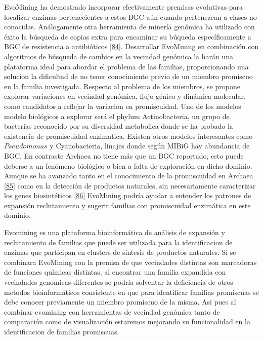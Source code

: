 \documentclass[12pt,twoside]{reedthesis}
\begin{document}
  EvoMining ha demostrado incorporar efectivamente premisas evolutivas
  para localizar enzimas pertenecientes a estos BGC aún cuando pertenezcan
  a clases no conocidas. Análogamente otra herramienta de minería genómica
  ha utilizado con éxito la búsqueda de copias extra para encaminar su
  búqueda específicamente a BGC de resistencia a antibióticos
  {[}\protect\hyperlink{ref-alanjary_antibiotic_2017}{84}{]}. Desarrollar
  EvoMining en combinación con algoritmos de búsqueda de cambios en la
  vecindad genómica la harán una plataforma ideal para abordar el problema
  de las familias, proporcionando una solucion la dificultad de no tener
  conocimiento previo de un miembro promiscuo en la familia investigada.
  Respecto al problema de los miembros, se propone explorar variaciones en
  vecindad genómica, flujo génico y dinámica molecular, como candidatos a
  reflejar la variacion en promiscuidad. Uno de los modelos modelo
  biológicos a explorar será el phylum Actinobacteria, un grupo de
  bacterias reconocido por su diversidad metabolica donde se ha probado la
  existencia de promiscuidad enzimatica. Existen otros modelos
  interesantes como \(Pseudomonas\) y Cyanobacteria, linajes donde según
  MIBiG hay abundancia de BGC. En contraste Archaea no tiene más que un
  BGC reportado, esto puede deberse a un fenómeno biológico o bien a falta
  de exploración en dicho dominio. Aunque se ha avanzado tanto en el
  conocimiento de la promiscuidad en Archaea
  {[}\protect\hyperlink{ref-martinez-nunez_promiscuity_Archaea_2017}{85}{]}
  como en la detección de productos naturales, sin necesariamente
  caracterizar los genes biosintéticos
  {[}\protect\hyperlink{ref-charlesworth_untapped_natural_products_Archaea_2015}{86}{]}
  EvoMining podría ayudar a entender los patrones de expansión
  reclutamiento y sugerir familias con promiscuidad enzimática en este
  dominio.
  
  Evomining es una plataforma bioinformática de análisis de expansión y
  reclutamiento de familias que puede ser utilizada para la identificacion
  de enzimas que participan en clusters de síntesis de productos
  naturales. Si se combinara EvoMining con la premisa de que vecindades
  distintas son marcadoras de funciones químicas distintas, al encontrar
  una familia expandida con vecindades genomicas diferentes se podría
  solventar la deficiencia de otros metodos bioinformáticos consistente en
  que para identificar familias promiscuas se debe conocer previamente un
  miembro promiscuo de la misma. Asi pues al combinar evomining con
  herramientas de vecindad genómica tanto de comparación como de
  visualización estaremos mejorando su funcionalidad en la identificacion
  de familias promiscuas.
  
\end{document}
